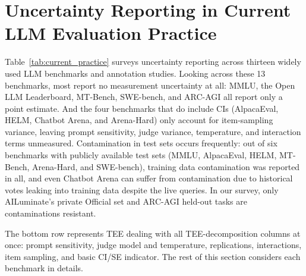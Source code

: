 \clearpage

\section{Uncertainty Reporting in Current LLM Evaluation Practice}
\label{si:current_practice}

Table~\ref{tab:current_practice} surveys uncertainty reporting across thirteen widely used LLM benchmarks and annotation studies. Looking across these 13 benchmarks, most report no measurement uncertainty at all: MMLU, the Open LLM Leaderboard, MT-Bench, SWE-bench, and ARC-AGI all report only a point estimate. And the four benchmarks that do include CIs (AlpacaEval, HELM, Chatbot Arena, and Arena-Hard) only account for item-sampling variance, leaving prompt sensitivity, judge variance, temperature, and interaction terms unmeasured. Contamination in test sets occurs frequently: out of six benchmarks with publicly available test sets (MMLU, AlpacaEval, HELM, MT-Bench, Arena-Hard, and SWE-bench), training data contamination was reported in all, and even Chatbot Arena can suffer from contamination due to historical votes leaking into training data despite the live queries. In our survey, only AILuminate's private Official set and ARC-AGI held-out tasks are contaminations resistant.

The bottom row represents TEE dealing with all TEE-decomposition columns at once: prompt sensitivity, judge model and temperature, replications, interactions, item sampling, and basic CI/SE indicator. The rest of this section considers each benchmark in details.



